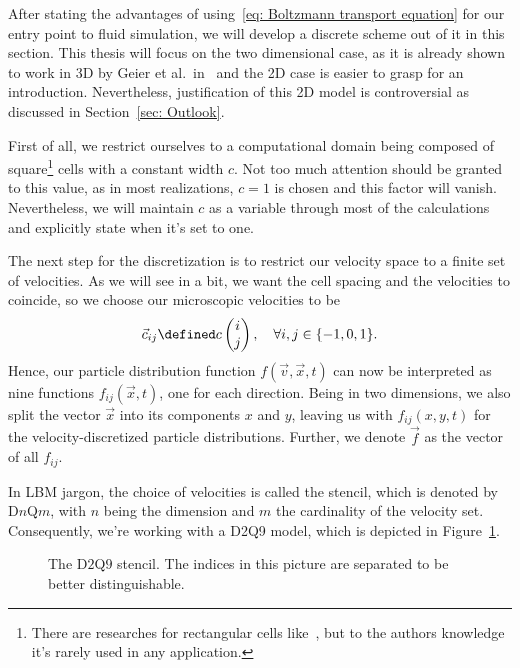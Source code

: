 After stating the advantages of using~\eqref{eq: Boltzmann transport equation} for our entry point to fluid simulation, we will develop a discrete scheme out of it in this section.
This thesis will focus on the two dimensional case, as it is already shown to work in 3D by Geier et al.\ in~\cite{geier2015cumulant} and the 2D case is easier to grasp for an introduction. Nevertheless, justification of this 2D model is controversial as discussed in Section~\ref{sec: Outlook}.

First of all, we restrict ourselves to a computational domain being composed of square\footnote{There are researches for rectangular cells like~\cite{Bouzidi2001704}, but to the authors knowledge it's rarely used in any application.} cells with a constant width $c$.
Not too much attention should be granted to this value, as in most realizations, $c=1$ is chosen and this factor will vanish.
Nevertheless, we will maintain $c$ as a variable through most of the calculations and explicitly state when it's set to one.

The next step for the discretization is to restrict our velocity space to a finite set of velocities. As we will see in a bit, we want the cell spacing and the velocities to coincide, so we choose our microscopic velocities to be
\begin{equation}
  \label{eq: definition of the velocities}
  \vec{c}_{ij} \defined c\begin{pmatrix}i \\ j\end{pmatrix}, \quad\forall i,j\in \{-1, 0, 1\}.
\end{equation}
Hence, our particle distribution function $f(\vec{v},\vec{x},t)$ can now be interpreted as nine functions $f_{ij}(\vec{x},t)$, one for each direction.
Being in two dimensions, we also split the vector $\vec{x}$ into its components $x$ and $y$, leaving us with $f_{ij}(x,y,t)$ for the velocity-discretized particle distributions.
Further, we denote $\vec{f}$ as the vector of all $f_{ij}$.

In LBM jargon, the choice of velocities is called the stencil, which is denoted by D$n$Q$m$, with $n$ being the dimension and $m$ the cardinality of the velocity set.
Consequently, we're working with a D2Q9 model, which is depicted in Figure~\ref{fig: D2Q9 stencil}.

\begin{figure}
  \centering
  
\caption{The D$2$Q$9$ stencil. The indices in this picture are separated to be better distinguishable.}
\label{fig: D2Q9 stencil}
\end{figure}

